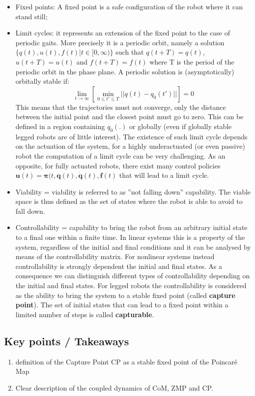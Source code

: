 \begin{itemize}
\item Fixed points: A fixed point is a safe configuration of the robot where it can stand still;
\item Limit cycles: it represents an extension of the fixed point to the case of periodic gaits. More precisely it is a periodic orbit, namely a solution $\{q(t), u(t), f(t) | t \in [0,\infty) \}$ such that $q(t+T) = q(t)$, $u(t+T) = u(t)$ and $f(t+T) = f(t)$ where T is the period of the periodic orbit in the phase plane. A periodic solution is (asymptotically) orbitally stable if:
$$ \lim_{t\to\infty} [ \min_{0\leq t' \leq T} || q(t) - q_0(t')|| ] = 0$$
This means that the trajectories must not converge, only the distance between the initial point and the closest point must go to zero. This can be defined in a region containing $q_0(.)$ or globally (even if globally stable legged robots are of little interest).
The existence of such limit cycle depends on the actuation of the system, for a highly underactuated (or even passive) robot the computation of a limit cycle can be very challenging. As an opposite, for fully actuated robots, there exist many control policies $\mathbf{u}(t) = \mathbold{\pi} (t, \mathbf{q}(t),\dot{\mathbf{q}}(t),\mathbf{f}(t)$ that will lead to a limit cycle.
\item Viability = viability is referred to as ''not falling down'' capability. The viable space is thus defined as the set of states where the robot is able to avoid to fall down.
\item Controllability = capability to bring the robot from an arbitrary initial state to a final one within a finite time. In linear systems this is a property of the system, regardless of the initial and final conditions and it can be analysed by means of the controllability matrix. For nonlinear systems instead controllability is strongly dependent the initial and final states.
As a consequence we can distinguish different types of controllability depending on the initial and final states. For legged robots the controllability is considered as the ability to bring the system to a stable fixed point (called \textbf{capture point}). The set of initial states that can lead to a fixed point within a limited number of steps is called \textbf{capturable}. 
\end{itemize}



\subsection*{Key points / Takeaways}
\begin{enumerate}
\item definition of the Capture Point CP as a stable fixed point of the Poincaré Map
\item Clear description of the coupled dynamics of CoM, ZMP and CP.
\end{enumerate}
